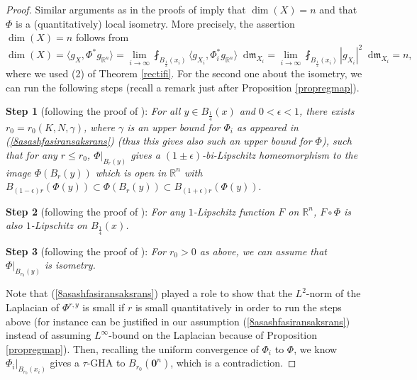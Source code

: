 \documentclass[11pt,reqno]{amsart}
\theoremstyle{definition}
\numberwithin{equation}{section}
\newcommand{\bo}{\bm{0}}
\newcommand{\di}{\mathop{}\!\mathrm{d}}
\newcommand{\meas}{\mathfrak{m}}
\begin{document}
\begin{proof}
       
         Similar arguments as in the proofs of \cite[Lemmas 5.4 and 5.5]{Hisom} imply that $\dim(X)=n$ and that $\Phi$ is a (quantitatively) local isometry. 
        More precisely, the assertion $\dim(X) =n$ follows from
        \begin{equation}
            \dim(X)=\langle g_X, \Phi^*g_{\mathbb{R}^n}\rangle =\lim_{i\to \infty}\fint_{B_{\frac{1}{2}}(x_i)}\langle g_{X_i}, \Phi^*_ig_{\mathbb{R}^n}\rangle\di \meas_{X_i}=\lim_{i\to \infty}\fint_{B_{\frac{1}{2}}(x_i)}|g_{X_i}|^2\di \meas_{X_i}=n,
        \end{equation}
        where we used (2) of Theorem \ref{rectifi}.
        For the second one about the isometry, we can run the following steps (recall a remark just after Proposition \ref{propregmap}). 
        
        \smallskip

        \textbf{Step 1} (following the proof of \cite[Lemma 5.3]{Hisom}): \textit{For all $y \in B_{\frac{1}{4}}(x)$ and $0<\epsilon<1$, there exists $r_0=r_0(K, N, \gamma)$, where $\gamma$ is an upper bound for $\Phi_i$ as appeared in (\ref{8asashfasiransaksrans}) (thus this gives also such an upper bound for $\Phi$), such that for any $r\le r_0$, $\Phi|_{B_r(y)}$ gives a $(1\pm \epsilon)$-bi-Lipschitz homeomorphism to the image $\Phi(B_r(y))$ which is open in $\mathbb{R}^n$ with 
        $
            B_{(1-\epsilon)r}(\Phi(y))\subset \Phi(B_r(y)) \subset B_{(1+\epsilon)r}(\Phi(y)).
        $
}

\smallskip

        
        \textbf{Step 2} (following the proof of \cite[Lemma 5.4]{Hisom}): \textit{For any $1$-Lipschitz function $F$ on $\mathbb{R}^n$, $F \circ \Phi$ is also $1$-Lipschitz on $B_{\frac{1}{4}}(x)$.
}

\smallskip
        

\textbf{Step 3} (following the proof of \cite[Lemma 5.5]{Hisom}): \textit{For $r_0>0$ as above, we can assume that $\Phi|_{B_{r_0}(y)}$ is isometry.}

\smallskip

Note that (\ref{8asashfasiransaksrans}) played a role to show that the $L^2$-norm of the Laplacian of $\Phi^{r, y}$ is small if $r$ is small quantitatively in order to run the steps above (for instance \cite[Theorem 3.4]{Hisom} can be justified in our assumption (\ref{8asashfasiransaksrans}) instead of assuming $L^{\infty}$-bound on the Laplacian because of Proposition \ref{propregmap}).
Then, recalling the uniform convergence of $\Phi_i$ to $\Phi$, we know $\Phi_i|_{B_{r_0}(x_i)}$ gives a $\tau$-GHA to $B_{r_0}(\bo^n)$, which is a contradiction.
\end{proof}
\end{document}
